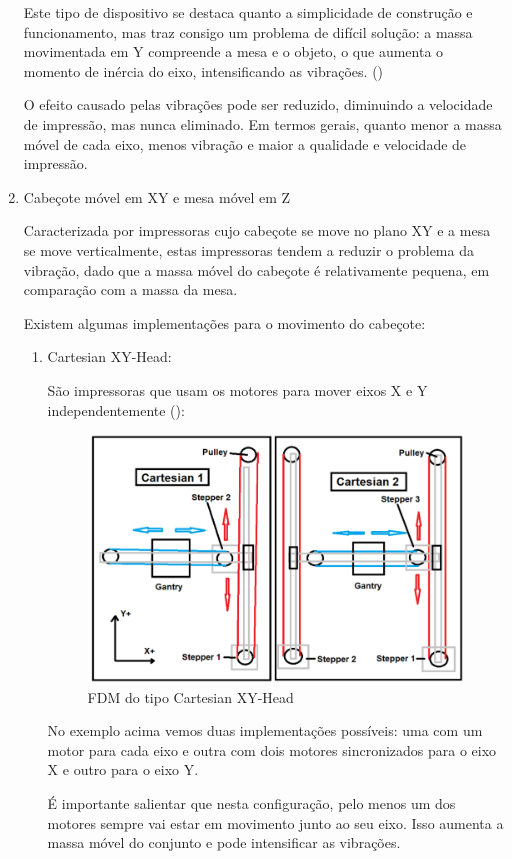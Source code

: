\documentclass[12pt, english]{article}
\begin{document}
\begin{enumerate}[leftmargin=*, listparindent=0.7cm]
{	Este tipo de dispositivo se destaca quanto a simplicidade de construção e funcionamento, mas traz consigo um problema de difícil solução: a massa movimentada em Y compreende a mesa e o objeto, o que aumenta o momento de inércia do eixo, intensificando as vibrações. (\cite{RINGING})

	O efeito causado pelas vibrações pode ser reduzido, diminuindo a velocidade de impressão, mas nunca eliminado. Em termos gerais, quanto menor a massa móvel de cada eixo, menos vibração e maior a qualidade e velocidade de impressão.

	}
	\item {
		Cabeçote móvel em XY e mesa móvel em Z
		
		Caracterizada por impressoras cujo cabeçote se move no plano XY e a mesa se move verticalmente, estas impressoras tendem a reduzir o problema da vibração, dado que a massa móvel do cabeçote é relativamente pequena, em comparação com a massa da mesa. 
		
		Existem algumas implementações para o movimento do cabeçote: 

		\begin{enumerate}[leftmargin=*, listparindent=0.7cm]
			\item {
				Cartesian XY-Head:
				
				São impressoras que usam os motores para mover eixos X e Y independentemente (\cite{Makksu2016}):
				
				\begin{figure}[H]
					\centering
					\includegraphics[height=.4\linewidth]{FDM-Cartesian.png}
					\caption{FDM do tipo Cartesian XY-Head}
				\end{figure}
		
				No exemplo acima vemos duas implementações possíveis: uma com um motor para cada eixo e outra com dois motores sincronizados para o eixo X e outro para o eixo Y.

				É importante salientar que nesta configuração, pelo menos um dos motores sempre vai estar em movimento junto ao seu eixo. Isso aumenta a massa móvel do conjunto e pode intensificar as vibrações.

}
\end{enumerate}}
\end{enumerate}
\end{document}
